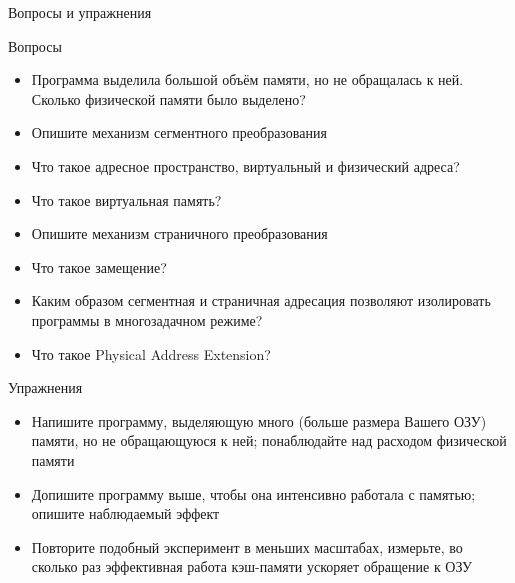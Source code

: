 \documentclass[xetex,aspectratio=43]{beamer}
\begin{document}
\begin{frame}{Вопросы и упражнения}
    \small
    \vspace{-3mm}
    \begin{block}{Вопросы}
        \begin{itemize}
            \tightlist
            \item
            Программа выделила большой объём памяти, но не обращалась к ней.
            Сколько физической памяти было выделено?
            \item
            Опишите механизм сегментного преобразования
            \item
            Что такое адресное пространство, виртуальный и физический адреса?
            \item
            Что такое виртуальная память?
            \item
            Опишите механизм страничного преобразования
            \item
            Что такое замещение?
            \item
            Каким образом сегментная и страничная адресация позволяют изолировать
            программы в многозадачном режиме?
            \item
            Что такое Physical Address Extension?
        \end{itemize}
    \end{block}
    \vspace{-3mm}
    \begin{block}{Упражнения}
        \begin{itemize}
            \tightlist
            \item
            Напишите программу, выделяющую много (больше размера Вашего ОЗУ)
            памяти, но не обращающуюся к ней; понаблюдайте над расходом физической
            памяти
            \item
            Допишите программу выше, чтобы она интенсивно работала с памятью;
            опишите наблюдаемый эффект
            \item
            Повторите подобный эксперимент в меньших масштабах, измерьте, во
            сколько раз эффективная работа кэш-памяти ускоряет обращение к ОЗУ
        \end{itemize}
    \end{block}
\end{frame}

\postamble
\end{document}
